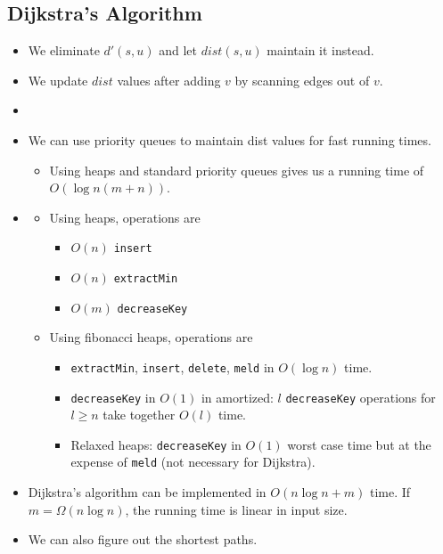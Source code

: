 \documentclass[12pt]{article}
\begin{document}
\subsection{Dijkstra's Algorithm}
\begin{itemize}
    \item We eliminate $d'(s, u)$ and let $dist(s, u)$ maintain it instead.
    \item We update $dist$ values after adding $v$ by scanning edges out of $v$.
    \item[] 
    \item We can use priority queues to maintain dist values for fast running times.
    \begin{itemize}
        \item Using heaps and standard priority queues gives us a running time of $O(\log n(m + n))$.
    \end{itemize}
    \item[] 
    \begin{itemize}
        \item Using heaps, operations are
        \begin{itemize}
            \item $O(n)$ \texttt{insert}
            \item $O(n)$ \texttt{extractMin}
            \item $O(m)$ \texttt{decreaseKey}
        \end{itemize}
        \item Using fibonacci heaps, operations are
        \begin{itemize}
            \item \texttt{extractMin}, \texttt{insert}, \texttt{delete}, \texttt{meld} in $O(\log n)$ time.
            \item \texttt{decreaseKey} in $O(1)$ in amortized: $l$ \texttt{decreaseKey} operations for $l \geq n$ take together $O(l)$ time.
            \item Relaxed heaps: \texttt{decreaseKey} in $O(1)$ worst case time but at the expense of \texttt{meld} (not necessary for Dijkstra).
        \end{itemize}
    \end{itemize}
    \item Dijkstra's algorithm can be implemented in $O(n\log n + m)$ time. If $m = \Omega(n\log n)$, the running time is linear in input size.
    \item We can also figure out the shortest paths.

\end{itemize}
\end{document}

